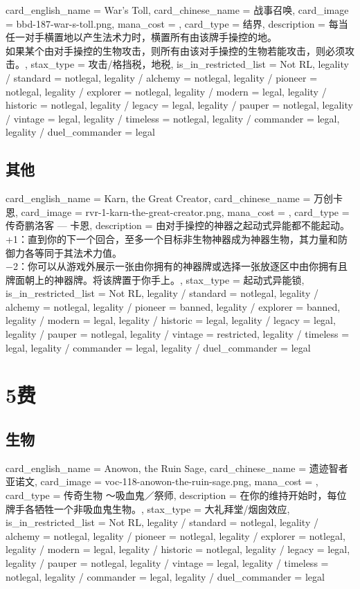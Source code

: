 \documentclass[lang = cn, color = black, 10pt]{AllThatStax}
\begin{document}
\card
{
	card_english_name = {War's Toll},
	card_chinese_name = {战事召唤},
	card_image = bbd-187-war-s-toll.png,
	mana_cost = ,
	card_type = 结界,
	description = {每当任一对手横置地以产生法术力时，横置所有由该牌手操控的地。\\
		如果某个由对手操控的生物攻击，则所有由该对手操控的生物若能攻击，则必须攻击。},
	stax_type = 攻击/格挡税，地税,
	is_in_restricted_list = Not RL,
	legality / standard = notlegal,
	legality / alchemy = notlegal,
	legality / pioneer = notlegal,
	legality / explorer = notlegal,
	legality / modern = legal,
	legality / historic = notlegal,
	legality / legacy = legal,
	legality / pauper = notlegal,
	legality / vintage = legal,
	legality / timeless = notlegal,
	legality / commander = legal,
	legality / duel_commander = legal
}

\section{其他}

\card
{
	card_english_name = {Karn, the Great Creator},
	card_chinese_name = {万创卡恩},
	card_image = rvr-1-karn-the-great-creator.png,
	mana_cost = ,
	card_type = 传奇鹏洛客 — 卡恩,
	description = {由对手操控的神器之起动式异能都不能起动。\\
		+1：直到你的下一个回合，至多一个目标非生物神器成为神器生物，其力量和防御力各等同于其法术力值。\\
		−2：你可以从游戏外展示一张由你拥有的神器牌或选择一张放逐区中由你拥有且牌面朝上的神器牌。将该牌置于你手上。},
	stax_type = 起动式异能锁,
	is_in_restricted_list = Not RL,
	legality / standard = notlegal,
	legality / alchemy = notlegal,
	legality / pioneer = banned,
	legality / explorer = banned,
	legality / modern = legal,
	legality / historic = legal,
	legality / legacy = legal,
	legality / pauper = notlegal,
	legality / vintage = restricted,
	legality / timeless = legal,
	legality / commander = legal,
	legality / duel_commander = legal
}

\chapter{5费}

\section{生物}

\card
{
	card_english_name = {Anowon, the Ruin Sage},
	card_chinese_name = {遗迹智者亚诺文},
	card_image = voc-118-anowon-the-ruin-sage.png,
	mana_cost = ,
	card_type = 传奇生物 ～吸血鬼／祭师,
	description = {在你的维持开始时，每位牌手各牺牲一个非吸血鬼生物。},
	stax_type = 大礼拜堂/烟囱效应,
	is_in_restricted_list = Not RL,
	legality / standard = notlegal,
	legality / alchemy = notlegal,
	legality / pioneer = notlegal,
	legality / explorer = notlegal,
	legality / modern = legal,
	legality / historic = notlegal,
	legality / legacy = legal,
	legality / pauper = notlegal,
	legality / vintage = legal,
	legality / timeless = notlegal,
	legality / commander = legal,
	legality / duel_commander = legal
}
\end{document}

